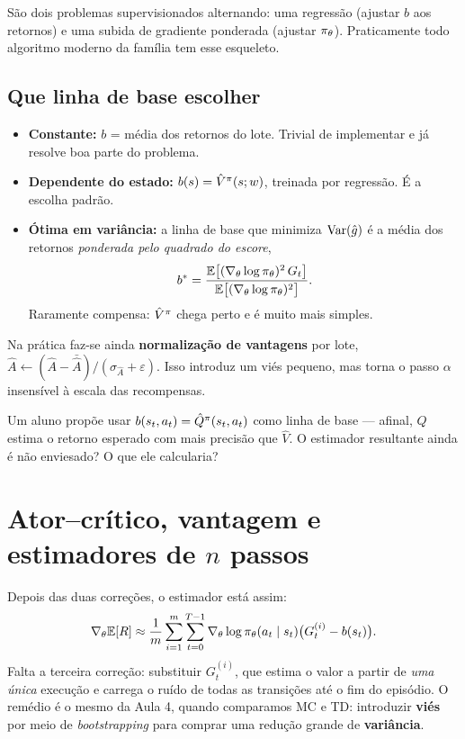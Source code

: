 \documentclass[11pt]{article}
\newcommand{\thv}{\theta}
\newcommand{\wv}{w}
\newcommand{\polth}{\pol_{\thv}}
\newcommand{\gth}{\nabla_{\thv}}
\newcommand{\Vhat}{\hat{V}}
\newcommand{\Qhat}{\hat{Q}}
\newcommand{\Ahat}{\hat{A}}
\begin{document}
\begin{ideiabox}
São dois problemas supervisionados alternando: uma regressão (ajustar $b$ aos
retornos) e uma subida de gradiente ponderada (ajustar $\polth$). Praticamente
todo algoritmo moderno da família tem esse esqueleto.
\end{ideiabox}

\subsection{Que linha de base escolher}

\begin{itemize}
  \item \textbf{Constante:} $b$ = média dos retornos do lote. Trivial de
    implementar e já resolve boa parte do problema.
  \item \textbf{Dependente do estado:} $b(s)=\Vhat^{\pol}(s;\wv)$, treinada por
    regressão. É a escolha padrão.
  \item \textbf{Ótima em variância:} a linha de base que minimiza $\operatorname{Var}(\hat g)$
    é a média dos retornos \emph{ponderada pelo quadrado do escore},
    \[
      b^{*} = \frac{\E\bigl[(\gth\log\polth)^2\,G_t\bigr]}
                   {\E\bigl[(\gth\log\polth)^2\bigr]} .
    \]
    Raramente compensa: $\Vhat^{\pol}$ chega perto e é muito mais simples.
\end{itemize}

Na prática faz-se ainda \textbf{normalização de vantagens} por lote,
$\Ahat \leftarrow (\Ahat - \bar{\Ahat})/(\sigma_{\Ahat}+\varepsilon)$. Isso
introduz um viés pequeno, mas torna o passo $\alpha$ insensível à escala das
recompensas.

\begin{discbox}
Um aluno propõe usar $b(s_t,a_t) = \Qhat^{\pol}(s_t,a_t)$ como linha de base
--- afinal, $\Qhat$ estima o retorno esperado com mais precisão que $\Vhat$.
O estimador resultante ainda é não enviesado? O que ele calcularia?
\end{discbox}

\section{Ator--crítico, vantagem e estimadores de \texorpdfstring{$n$}{n} passos}

Depois das duas correções, o estimador está assim:
\[
  \gth\E[R] \approx \frac{1}{m}\sum_{i=1}^{m}\sum_{t=0}^{T-1}
    \gth\log\polth(a_t\mid s_t)\bigl(G^{(i)}_t - b(s_t)\bigr).
\]
Falta a terceira correção: substituir $G^{(i)}_t$, que estima o valor a partir de
\emph{uma única} execução e carrega o ruído de todas as transições até o fim do
episódio. O remédio é o mesmo da Aula 4, quando comparamos MC e TD: introduzir
\textbf{viés} por meio de \emph{bootstrapping} para comprar uma redução grande de
\textbf{variância}.
\end{document}
